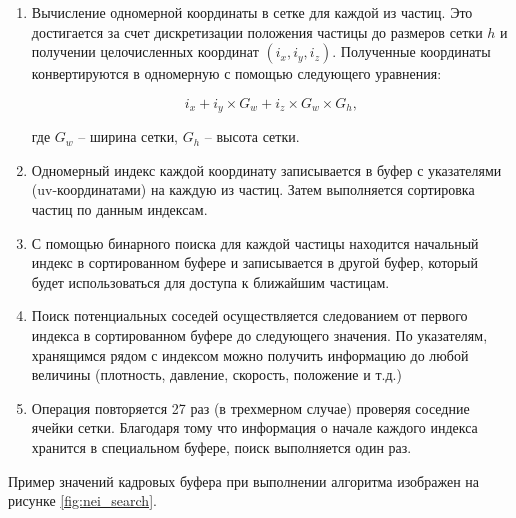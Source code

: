 \begin{enumerate}
  \item Вычисление одномерной координаты в сетке для каждой из частиц. Это достигается за счет
    дискретизации положения частицы до размеров сетки $h$ и получении целочисленных координат
    $(i_x, i_y, i_z)$. Полученные координаты конвертируются в одномерную с помощью следующего
    уравнения:

    \begin{equation}
    \label{eq:}
      i_x + i_y \times G_w + i_z \times G_w \times G_h,
    \end{equation}

    где $G_w$ -- ширина сетки, $G_h$ -- высота сетки.

  \item Одномерный индекс каждой координату записывается в буфер с указателями (uv-координатами)
    на каждую из частиц. Затем выполняется сортировка частиц по данным индексам.

  \item С помощью бинарного поиска для каждой частицы находится начальный индекс в сортированном
    буфере и записывается в другой буфер, который будет использоваться для доступа к ближайшим
    частицам.

  \item Поиск потенциальных соседей осуществляется следованием от первого индекса в сортированном
    буфере до следующего значения. По указателям, хранящимся рядом с индексом можно получить 
    информацию до любой величины (плотность, давление, скорость, положение и т.д.)

  \item Операция повторяется 27 раз (в трехмерном случае) проверяя соседние ячейки сетки.
    Благодаря тому что информация о начале каждого индекса хранится в специальном буфере,
    поиск выполняется один раз.

\end{enumerate}

Пример значений кадровых буфера при выполнении алгоритма изображен на рисунке \ref{fig:nei_search}.

